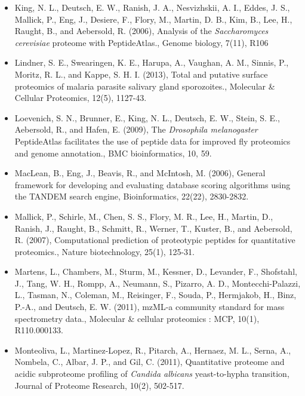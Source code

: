 \begin{itemize}[leftmargin=*]
\item[]{
King, N. L., Deutsch, E. W., Ranish, J. A., Nesvizhskii, A. I., Eddes, J. S., Mallick, P., Eng, J.,
Desiere, F., Flory, M., Martin, D. B., Kim, B., Lee, H., Raught, B., and Aebersold, R. (2006),
Analysis of the \textit{Saccharomyces cerevisiae} proteome with PeptideAtlas., Genome biology,
7(11), R106
}

\item[]{
Lindner, S. E., Swearingen, K. E., Harupa, A., Vaughan, A. M., Sinnis, P., Moritz, R. L., and
Kappe, S. H. I. (2013), Total and putative surface proteomics of malaria parasite salivary
gland sporozoites., Molecular \& Cellular Proteomics, 12(5), 1127-43.
}

\item[]{
Loevenich, S. N., Brunner, E., King, N. L., Deutsch, E. W., Stein, S. E., Aebersold, R., and
Hafen, E. (2009), The \textit{Drosophila melanogaster} PeptideAtlas facilitates the use of peptide
data for improved fly proteomics and genome annotation., BMC bioinformatics, 10, 59.
}

\item[]{
MacLean, B., Eng, J., Beavis, R., and McIntosh, M. (2006), General framework for developing
and evaluating database scoring algorithms using the TANDEM search engine, 
Bioinformatics, 22(22), 2830-2832.
}

\item[]{
Mallick, P., Schirle, M., Chen, S. S., Flory, M. R., Lee, H., Martin, D., Ranish, J., Raught, B.,
Schmitt, R., Werner, T., Kuster, B., and Aebersold, R. (2007), Computational prediction of
proteotypic peptides for quantitative proteomics., Nature biotechnology, 25(1), 125-31.
}

\item[]{
Martens, L., Chambers, M., Sturm, M., Kessner, D., Levander, F., Shofstahl, J., Tang, W. H.,
Rompp, A., Neumann, S., Pizarro, A. D., Montecchi-Palazzi, L., Tasman, N., Coleman, M.,
Reisinger, F., Souda, P., Hermjakob, H., Binz, P.-A., and Deutsch, E. W. (2011), mzML-a
community standard for mass spectrometry data., Molecular \& cellular proteomics : MCP,
10(1), R110.000133.
}

\item[]{
Monteoliva, L., Martinez-Lopez, R., Pitarch, A., Hernaez, M. L., Serna, A., Nombela, C., Albar,
J. P., and Gil, C. (2011), Quantitative proteome and acidic subproteome profiling of \textit{Candida
albicans} yeast-to-hypha transition, Journal of Proteome Research, 10(2), 502-517.
}


\end{itemize}
